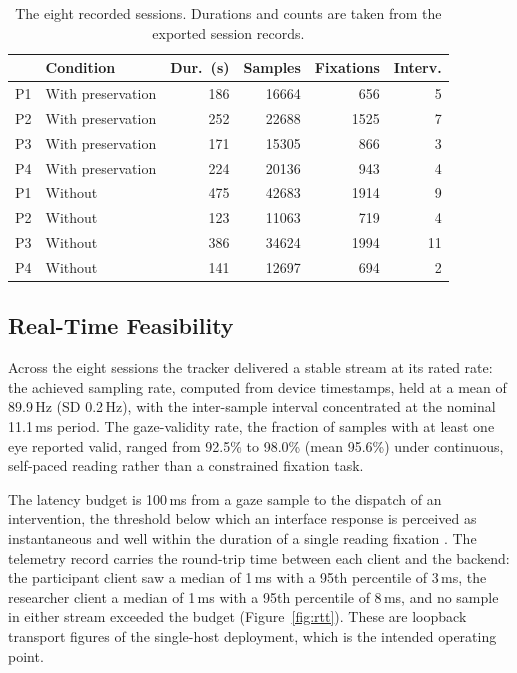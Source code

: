 \begin{table}
\centering
\small
\caption{The eight recorded sessions.
Durations and counts are taken from the exported session records.}
\label{tab:sessions}
\begin{tabular}{@{}llrrrr@{}}
\toprule
 & Condition & Dur.\ (s) & Samples & Fixations & Interv. \\
\midrule
P1 & With preservation & 186 & 16664 & 656 & 5 \\
P2 & With preservation & 252 & 22688 & 1525 & 7 \\
P3 & With preservation & 171 & 15305 & 866 & 3 \\
P4 & With preservation & 224 & 20136 & 943 & 4 \\
P1 & Without & 475 & 42683 & 1914 & 9 \\
P2 & Without & 123 & 11063 & 719 & 4 \\
P3 & Without & 386 & 34624 & 1994 & 11 \\
P4 & Without & 141 & 12697 & 694 & 2 \\
\bottomrule
\end{tabular}
\end{table}

\subsection{Real-Time Feasibility}
\label{sec:eval-perf}

Across the eight sessions the tracker delivered a stable stream at its rated rate: the achieved sampling rate, computed from device timestamps, held at a mean of 89.9\,Hz (SD 0.2\,Hz), with the inter-sample interval concentrated at the nominal 11.1\,ms period.
The gaze-validity rate, the fraction of samples with at least one eye reported valid, ranged from 92.5\% to 98.0\% (mean 95.6\%) under continuous, self-paced reading rather than a constrained fixation task.

The latency budget is 100\,ms from a gaze sample to the dispatch of an intervention, the threshold below which an interface response is perceived as instantaneous \cite{miller1968response, nielsen1993responsetime} and well within the duration of a single reading fixation \cite{rayner1998eyemovements}.
The telemetry record carries the round-trip time between each client and the backend: the participant client saw a median of 1\,ms with a 95th percentile of 3\,ms, the researcher client a median of 1\,ms with a 95th percentile of 8\,ms, and no sample in either stream exceeded the budget (Figure~\ref{fig:rtt}).
These are loopback transport figures of the single-host deployment, which is the intended operating point.

